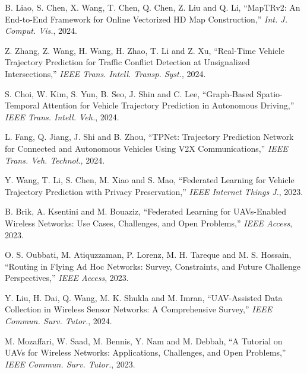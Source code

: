  B. Liao, S. Chen, X. Wang, T. Chen, Q. Chen, Z. Liu and Q. Li, ``MapTRv2: An End-to-End Framework for Online Vectorized HD Map Construction,'' \emph{Int. J. Comput. Vis.}, 2024.

 Z. Zhang, Z. Wang, H. Wang, H. Zhao, T. Li and Z. Xu, ``Real-Time Vehicle Trajectory Prediction for Traffic Conflict Detection at Unsignalized Intersections,'' \emph{IEEE Trans. Intell. Transp. Syst.}, 2024.

 S. Choi, W. Kim, S. Yun, B. Seo, J. Shin and C. Lee, ``Graph-Based Spatio-Temporal Attention for Vehicle Trajectory Prediction in Autonomous Driving,'' \emph{IEEE Trans. Intell. Veh.}, 2024.

 L. Fang, Q. Jiang, J. Shi and B. Zhou, ``TPNet: Trajectory Prediction Network for Connected and Autonomous Vehicles Using V2X Communications,'' \emph{IEEE Trans. Veh. Technol.}, 2024.

 Y. Wang, T. Li, S. Chen, M. Xiao and S. Mao, ``Federated Learning for Vehicle Trajectory Prediction with Privacy Preservation,'' \emph{IEEE Internet Things J.}, 2023.


 B. Brik, A. Ksentini and M. Bouaziz, ``Federated Learning for UAVs-Enabled Wireless Networks: Use Cases, Challenges, and Open Problems,'' \emph{IEEE Access}, 2023.

 O. S. Oubbati, M. Atiquzzaman, P. Lorenz, M. H. Tareque and M. S. Hossain, ``Routing in Flying Ad Hoc Networks: Survey, Constraints, and Future Challenge Perspectives,'' \emph{IEEE Access}, 2023.

 Y. Liu, H. Dai, Q. Wang, M. K. Shukla and M. Imran, ``UAV-Assisted Data Collection in Wireless Sensor Networks: A Comprehensive Survey,'' \emph{IEEE Commun. Surv. Tutor.}, 2024.

 M. Mozaffari, W. Saad, M. Bennis, Y. Nam and M. Debbah, ``A Tutorial on UAVs for Wireless Networks: Applications, Challenges, and Open Problems,'' \emph{IEEE Commun. Surv. Tutor.}, 2023.

